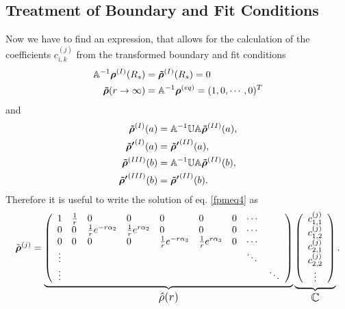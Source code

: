 \subsection{Treatment of Boundary and Fit Conditions}
\label{Treatment_of_Boundary_and_Fit_Conditions}
Now we have to find an expression, that allows for the calculation of the coefficients $c_{i,k}^{(j)}$ from the transformed boundary and fit conditions
\begin{align}
    \mathbb{A}^{-1}\boldsymbol{\mathbf{\rho}}^{(I)}(R_s) &= \boldsymbol{\mathbf{\tilde{\rho}}}^{(I)}(R_s) = 0 \nonumber \\
    \boldsymbol{\mathbf{\tilde{\rho}}}(r \rightarrow \infty) &= \mathbb{A}^{-1} \boldsymbol{\mathbf{\rho}}^{(eq)} = (1,0,\cdots,0)^{T}
\end{align}
and
\begin{align}
    \boldsymbol{\mathbf{\tilde{\rho}}}^{(I)}(a) &= \mathbb{A}^{-1}\mathbb{U}\mathbb{A} \boldsymbol{\mathbf{\tilde{\rho}}}^{(II)}(a), \\ \nonumber
    \boldsymbol{\mathbf{\tilde{\rho} '}}^{(I)}(a) &= \boldsymbol{\mathbf{\tilde{\rho} '}}^{(II)}(a), \\ \nonumber
    \boldsymbol{\mathbf{\tilde{\rho}}}^{(III)}(b) &= \mathbb{A}^{-1}\mathbb{U}\mathbb{A} \boldsymbol{\mathbf{\tilde{\rho}}}^{(II)}(b), \\ \nonumber
    \boldsymbol{\mathbf{\tilde{\rho} '}}^{(III)}(b) &= \boldsymbol{\mathbf{\tilde{\rho} '}}^{(II)}(b).
\end{align}
Therefore it is useful to write the solution of eq. \eqref{fpmeq4} as
\begin{equation}
    \tilde{\boldsymbol{\mathbf{\rho}}}^{(j)} = \underbrace{ \left( \begin{array}{cllllllll}
       1   & \frac{1}{r}   & 0                 & 0                 & 0              & 0             & 0 & \cdots &\\
       0   & 0             &\frac{1}{r} e^{-r \alpha_2}   &\frac{1}{r} e^{r \alpha_2 }   & 0              & 0             & 0 & \cdots &\\
       0   & 0             & 0                 & 0                 &\frac{1}{r} e^{-r\alpha_3} &\frac{1}{r} e^{r\alpha_3} & 0 & \cdots &\\
       \vdots  &&&&&&&\ddots &\\
       \vdots  &&&&&&&&\ddots
   \end{array} \right)}_\text{\large$\hat{\rho}(r)$}
   \underbrace{\left(\begin{array}{c}  
       c_{1,1}^{(j)} \\ 
       c_{1,2}^{(j)} \\ 
       c_{2,1}^{(j)} \\ 
       c_{2,2}^{(j)}  \\ 
       \vdots 
   \end{array} \right)}_\text{\large$\mathbb{C}$}.
\end{equation}
